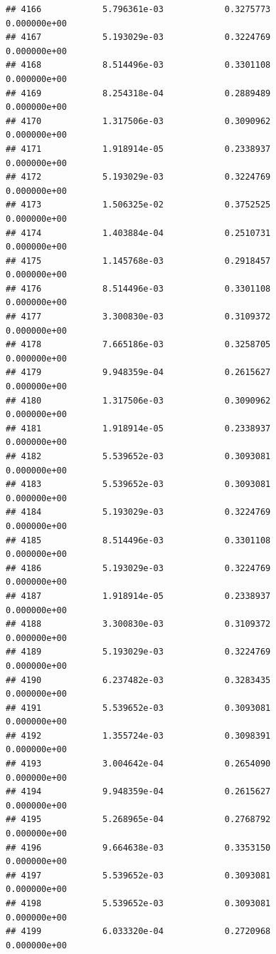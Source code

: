 \documentclass[
]{article}
\begin{document}
\begin{verbatim}
## 4166            5.796361e-03            0.3275773            0.000000e+00
## 4167            5.193029e-03            0.3224769            0.000000e+00
## 4168            8.514496e-03            0.3301108            0.000000e+00
## 4169            8.254318e-04            0.2889489            0.000000e+00
## 4170            1.317506e-03            0.3090962            0.000000e+00
## 4171            1.918914e-05            0.2338937            0.000000e+00
## 4172            5.193029e-03            0.3224769            0.000000e+00
## 4173            1.506325e-02            0.3752525            0.000000e+00
## 4174            1.403884e-04            0.2510731            0.000000e+00
## 4175            1.145768e-03            0.2918457            0.000000e+00
## 4176            8.514496e-03            0.3301108            0.000000e+00
## 4177            3.300830e-03            0.3109372            0.000000e+00
## 4178            7.665186e-03            0.3258705            0.000000e+00
## 4179            9.948359e-04            0.2615627            0.000000e+00
## 4180            1.317506e-03            0.3090962            0.000000e+00
## 4181            1.918914e-05            0.2338937            0.000000e+00
## 4182            5.539652e-03            0.3093081            0.000000e+00
## 4183            5.539652e-03            0.3093081            0.000000e+00
## 4184            5.193029e-03            0.3224769            0.000000e+00
## 4185            8.514496e-03            0.3301108            0.000000e+00
## 4186            5.193029e-03            0.3224769            0.000000e+00
## 4187            1.918914e-05            0.2338937            0.000000e+00
## 4188            3.300830e-03            0.3109372            0.000000e+00
## 4189            5.193029e-03            0.3224769            0.000000e+00
## 4190            6.237482e-03            0.3283435            0.000000e+00
## 4191            5.539652e-03            0.3093081            0.000000e+00
## 4192            1.355724e-03            0.3098391            0.000000e+00
## 4193            3.004642e-04            0.2654090            0.000000e+00
## 4194            9.948359e-04            0.2615627            0.000000e+00
## 4195            5.268965e-04            0.2768792            0.000000e+00
## 4196            9.664638e-03            0.3353150            0.000000e+00
## 4197            5.539652e-03            0.3093081            0.000000e+00
## 4198            5.539652e-03            0.3093081            0.000000e+00
## 4199            6.033320e-04            0.2720968            0.000000e+00

\end{verbatim}
\end{document}
